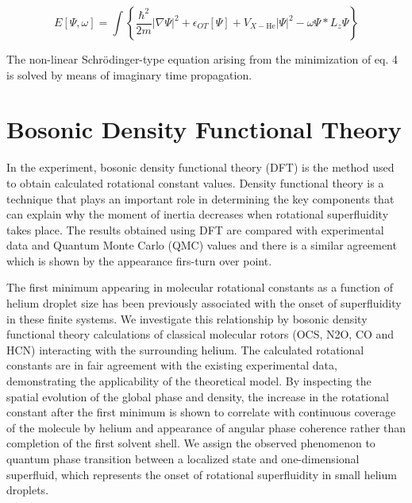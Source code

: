 \documentclass[12pt,]{book}
\newenvironment{Shaded}{}{}
\begin{document}
\begin{equation}
\label{eq:OTDFT}
E[\Psi,\omega]=\int\left\{\frac{\hbar^2}{2m}\rvert\nabla\Psi\rvert^2+\epsilon_{OT}[\Psi]+V_{X-\text{He}}\rvert\Psi\rvert^2-\omega \Psi*L_z\Psi\right\}
\end{equation}

The non-linear Schrödinger-type equation arising from the minimization
of eq. 4 is solved by means of imaginary time propagation.

\section*{Bosonic Density Functional Theory}

In the experiment, bosonic density functional theory (DFT) is the method
used to obtain calculated rotational constant values. Density functional
theory is a technique that plays an important role in determining the
key components that can explain why the moment of inertia decreases when
rotational superfluidity takes place. The results obtained using DFT are
compared with experimental data and Quantum Monte Carlo (QMC) values and
there is a similar agreement which is shown by the appearance firs-turn
over point.

The first minimum appearing in molecular rotational constants as a
function of helium droplet size has been previously associated with the
onset of superfluidity in these finite systems. We investigate this
relationship by bosonic density functional theory calculations of
classical molecular rotors (OCS, N2O, CO and HCN) interacting with the
surrounding helium. The calculated rotational constants are in fair
agreement with the existing experimental data, demonstrating the
applicability of the theoretical model. By inspecting the spatial
evolution of the global phase and density, the increase in the
rotational constant after the first minimum is shown to correlate with
continuous coverage of the molecule by helium and appearance of angular
phase coherence rather than completion of the first solvent shell. We
assign the observed phenomenon to quantum phase transition between a
localized state and one-dimensional superfluid, which represents the
onset of rotational superfluidity in small helium droplets.

\begin{Shaded}
\begin{Highlighting}[]

\end{Highlighting}
\end{Shaded}
\end{document}
